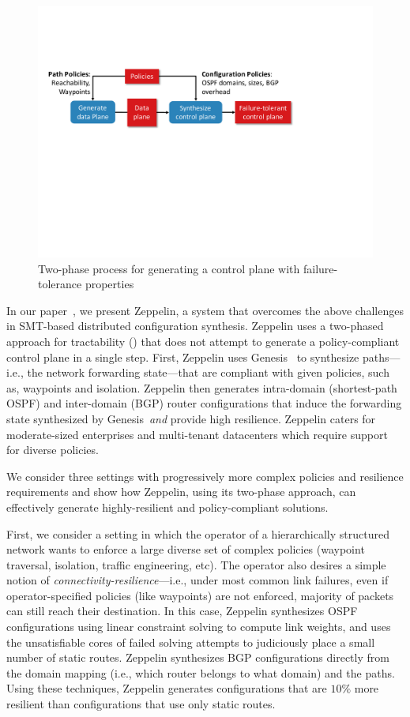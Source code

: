\documentclass[sigconf]{acmart}
\newcommand{\name}{{\sc Zeppelin}\xspace}
\newcommand{\genesis}{Genesis\xspace}
\begin{document}
\begin{figure}
	\includegraphics[width=0.7\columnwidth]{figures/architecture.pdf}
	\caption{Two-phase process for generating a control plane
		with failure-tolerance properties}
	\label{fig:architecture}
\end{figure}

In our paper~\cite{zeppelin}, we present \name, a system that overcomes the above
challenges in SMT-based distributed configuration synthesis.  \name
uses a two-phased approach for tractability ()
that does not attempt to generate a policy-compliant control plane in
a single step.  First, \name uses \genesis~\cite{genesis} to
synthesize paths---i.e., the network forwarding state---that are
compliant with given policies, such as, waypoints and isolation.
\name then generates intra-domain (shortest-path OSPF) and
inter-domain (BGP) router configurations that induce the forwarding
state synthesized by \genesis\ {\em and} provide high resilience. \name 
caters for moderate-sized enterprises and multi-tenant datacenters 
which require support for diverse policies.

We consider three settings with progressively more complex policies
and resilience requirements and show how \name, using its two-phase
approach, can effectively generate highly-resilient and
policy-compliant solutions.

First, we consider a setting in which the operator of a hierarchically
structured network wants to enforce a large diverse set of complex
policies (waypoint traversal, isolation, traffic engineering, etc).
The operator also desires a simple notion of
\emph{connectivity-resilience}---i.e., under most common
link failures, even if operator-specified policies (like waypoints)
are not enforced, majority of packets can still reach their destination.  In this
case, \name synthesizes OSPF configurations using linear constraint
solving to compute link weights, and uses the unsatisfiable cores of
failed solving attempts to judiciously place a small number of static
routes.  \name synthesizes BGP configurations directly from the domain
mapping (i.e., which router belongs to what domain) and the paths.
Using these techniques, \name generates configurations that are
$10\%$ more resilient than configurations that use only static routes.
\end{document}
